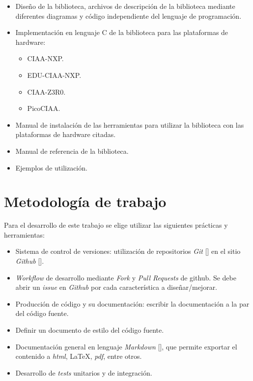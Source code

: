 \begin{itemize}
\item
Diseño de la biblioteca, archivos de descripción de la biblioteca mediante diferentes diagramas y código independiente del lenguaje de programación.
\item
Implementación en lenguaje C de la biblioteca para las plataformas de hardware:
\begin{itemize}
\item CIAA-NXP.
\item EDU-CIAA-NXP.
\item CIAA-Z3R0.
\item PicoCIAA.
\end{itemize}
\item
Manual de instalación de las herramientas para utilizar la biblioteca con las plataformas de hardware citadas.
\item
Manual de referencia de la biblioteca.
\item
Ejemplos de utilización.
\end{itemize}

\section{Metodología de trabajo}

Para el desarrollo de este trabajo se elige utilizar las siguientes prácticas y herramientas:

\begin{itemize}
\item
Sistema de control de versiones: utilización de repositorios \emph{Git} [] en el sitio \emph{Github} []. 
\item
\emph{Workflow} de desarrollo mediante \emph{Fork} y \emph{Pull Requests} de github. Se debe abrir un \emph{issue} en \emph{Github} por cada característica a diseñar/mejorar.
\item
Producción de código y su documentación: escribir la documentación a la par del código fuente.
\item
Definir un documento de estilo del código fuente.
\item
Documentación general en lenguaje \emph{Markdown} [], que permite exportar el contenido a \emph{html}, \LaTeX, \emph{pdf}, entre otros.
\item
Desarrollo de \emph{tests} unitarios y de integración.
\end{itemize}
